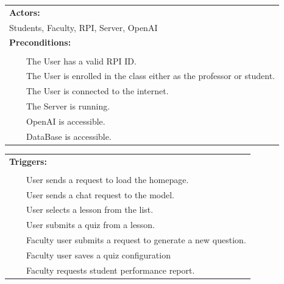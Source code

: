 \documentclass[12pt,a4paper]{article}
\newcommand{\tabitem}{\\~~\llap{\textbullet}~~}
\begin{document}
\begin{appendices}
\begin{table}[H]
\begin{tabular}{|p{13cm}|}
            \textbf{Actors:}\\

            Students, Faculty, RPI, Server, OpenAI\\\hline

            \textbf{Preconditions:} \\\makecell[l]{
                \tabitem The User has a valid RPI ID.
                \tabitem The User is enrolled in the class either as the professor or student.
                \tabitem The User is connected to the internet.
                \tabitem The Server is running.
                \tabitem OpenAI is accessible.
                \tabitem DataBase is accessible.
            }\\\hline

        \end{tabular}
        \end{table}

        \begin{table}[H]
        \label{tab:useCaseDoc2}
        \centering
        \def\arraystretch{1.4}
        \begin{tabular}{|p{13cm}|}
            \hline

            \textbf{Triggers:} \\\makecell[l]{
                \tabitem User sends a request to load the homepage.
                \tabitem User sends a chat request to the model.
                \tabitem User selects a lesson from the list.
                \tabitem User submits a quiz from a lesson.
                \tabitem Faculty user submits a request to generate a new question.
                \tabitem Faculty user saves a quiz configuration
                \tabitem Faculty requests student performance report.
            }\\\hline


\end{tabular}
\end{table}
\end{appendices}
\end{document}
